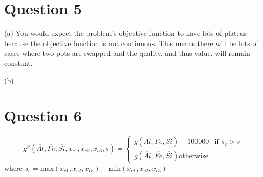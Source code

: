 \documentclass{article}
\begin{document}
\section{Question 5}
(a) You would expect the problem's objective function to have lots of 
plateus because the objective function is not continuous. This means
there will be lots of cases where two pots are swapped and the
quality, and thus value, will remain constant.

(b) 

\section{Question 6}
$$g''(\overline{Al}, \overline{Fe}, \overline{Si}, x_{c1}, x_{c2}, 
x_{c3}, s) =
\begin{cases}
    g(\overline{Al}, \overline{Fe}, \overline{Si}) - 100000 & \text{if } s_c > s \\
    g(\overline{Al}, \overline{Fe}, \overline{Si}) \text{otherwise}
\end{cases}$$ where
$s_c = \text{max}(x_{c1}, x_{c2}, x_{c3}) - \text{min}(x_{c1}, x_{c2}, x_{c3})$
\end{document}
